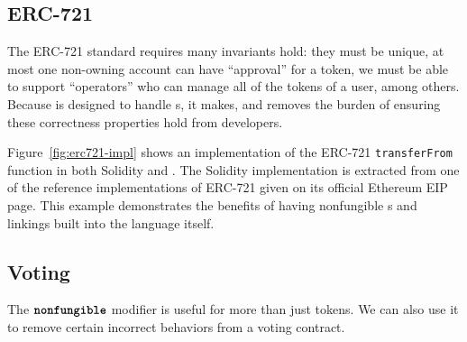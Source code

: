 \documentclass[sigconf]{acmart}
\begin{document}
\subsection{ERC-721}

The ERC-721 standard  requires many invariants hold:
    they must be unique,
    at most one non-owning account can have ``approval'' for a token,
    we must be able to support ``operators'' who can manage all of the tokens of a user,
    among others.
Because \langName is designed to handle \assetTxt{}s, it makes, and removes the burden of ensuring these correctness properties hold from developers.

Figure~\ref{fig:erc721-impl} shows an implementation of the ERC-721 \lstinline{transferFrom} function in both Solidity and \langName.
The Solidity implementation is extracted from one of the reference implementations of ERC-721 given on its official Ethereum EIP page.
This example demonstrates the benefits of having nonfungible \assetTxt{}s and linkings built into the language itself.

\begin{figure*}[h]
    \centering
    \begin{minipage}[t]{0.5\textwidth}
        
    \end{minipage}%
    \begin{minipage}[t]{0.5\textwidth}
        
    \end{minipage}
    \caption{A Solidity and a \langName implementation of the \lstinline{transferFrom} function of the ERC-721 standard.}
    \label{fig:erc721-impl}
\end{figure*}

\subsection{Voting}
The $\textbf{\texttt{nonfungible}}$ modifier is useful for more than just tokens.
We can also use it to remove certain incorrect behaviors from a voting contract.
\end{document}
